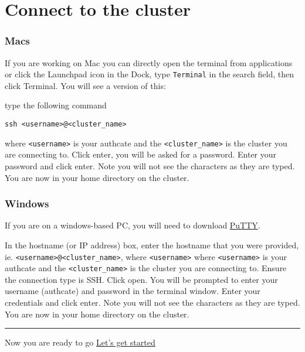 \documentclass[
]{book}
\begin{document}
\hypertarget{connect-to-the-cluster}{%
\chapter{Connect to the cluster}\label{connect-to-the-cluster}}

\hypertarget{macs}{%
\subsection{Macs}\label{macs}}

If you are working on Mac you can directly open the terminal from applications or click the Launchpad icon in the Dock, type \texttt{Terminal} in the search field, then click Terminal. You will see a version of this:

type the following command

\begin{verbatim}
ssh <username>@<cluster_name>
\end{verbatim}

where \texttt{\textless{}username\textgreater{}} is your authcate and the \texttt{\textless{}cluster\_name\textgreater{}} is the cluster you are connecting to. Click enter, you will be asked for a password. Enter your password and click enter. Note you will not see the characters as they are typed. You are now in your home directory on the cluster.

\hypertarget{windows}{%
\subsection{Windows}\label{windows}}

If you are on a windows-based PC, you will need to download \href{https://www.putty.org/}{PuTTY}.

In the hostname (or IP address) box, enter the hostname that you were provided, ie. \texttt{\textless{}username\textgreater{}@\textless{}cluster\_name\textgreater{}}, where \texttt{\textless{}username\textgreater{}} where \texttt{\textless{}username\textgreater{}} is your authcate and the \texttt{\textless{}cluster\_name\textgreater{}} is the cluster you are connecting to. Ensure the connection type is SSH. Click open. You will be prompted to enter your username (authcate) and password in the terminal window. Enter your credentials and click enter. Note you will not see the characters as they are typed. You are now in your home directory on the cluster.

\begin{center}\rule{0.5\linewidth}{0.5pt}\end{center}

Now you are ready to go
{\href{introduction.html}{Let's get started}}
\end{document}

